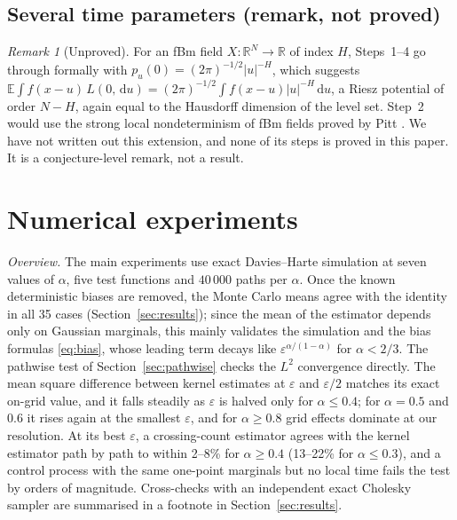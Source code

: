 \documentclass[11pt]{article}
\theoremstyle{remark}
\newtheorem{remark}[theorem]{Remark}
\theoremstyle{definition}
\newcommand{\E}{\mathbb{E}}
\newcommand{\R}{\mathbb{R}}
\newcommand{\dd}{\,\mathrm{d}}
\begin{document}
\subsection{Several time parameters (remark, not proved)}\label{sec:multi}
\begin{remark}[Unproved]\label{rem:multi}
For an fBm field $X:\R^N\to\R$ of index $H$, Steps~1--4 go through formally with $p_u(0)=(2\pi)^{-1/2}|u|^{-H}$, which suggests $\E\int f(x-u)\,L(0,\dd u)=(2\pi)^{-1/2}\int f(x-u)|u|^{-H}\dd u$, a Riesz potential of order $N-H$, again equal to the Hausdorff dimension of the level set. Step~2 would use the strong local nondeterminism of fBm fields proved by Pitt \cite{Pit78}. We have not written out this extension, and none of its steps is proved in this paper. It is a conjecture-level remark, not a result.
\end{remark}

\section{Numerical experiments}\label{sec:numerics}
\emph{Overview.} The main experiments use exact Davies--Harte simulation at seven values of $\alpha$, five test functions and $40\,000$ paths per $\alpha$. Once the known deterministic biases are removed, the Monte Carlo means agree with the identity in all 35 cases (Section~\ref{sec:results}); since the mean of the estimator depends only on Gaussian marginals, this mainly validates the simulation and the bias formulas \eqref{eq:bias}, whose leading term decays like $\varepsilon^{\alpha/(1-\alpha)}$ for $\alpha<2/3$. The pathwise test of Section~\ref{sec:pathwise} checks the $L^2$ convergence directly. The mean square difference between kernel estimates at $\varepsilon$ and $\varepsilon/2$ matches its exact on-grid value, and it falls steadily as $\varepsilon$ is halved only for $\alpha\le0.4$; for $\alpha=0.5$ and $0.6$ it rises again at the smallest $\varepsilon$, and for $\alpha\ge0.8$ grid effects dominate at our resolution. At its best $\varepsilon$, a crossing-count estimator agrees with the kernel estimator path by path to within 2--8\% for $\alpha\ge0.4$ (13--22\% for $\alpha\le0.3$), and a control process with the same one-point marginals but no local time fails the test by orders of magnitude. Cross-checks with an independent exact Cholesky sampler are summarised in a footnote in Section~\ref{sec:results}.
\end{document}

